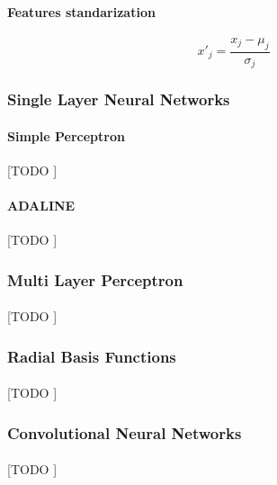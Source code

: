 \documentclass{article}
\begin{document}
			\paragraph{Features standarization}

			\begin{equation}
				x'_j = \frac{x_j - \mu_j}{\sigma_j}
			\end{equation}


			\subsubsection{Single Layer Neural Networks}
			\label{sec:single-layer-nn}


				\paragraph{Simple Perceptron}
				\label{sec:perceptron}
				[TODO ]

				\paragraph{ADALINE}
				\label{sec:adaline}
				[TODO ]

			\subsubsection{Multi Layer Perceptron}
			\label{sec:mlp}

				\paragraph{}
				[TODO ]

			\subsubsection{Radial Basis Functions}
			\label{sec:rbf}

				\paragraph{}
				[TODO ]

			\subsubsection{Convolutional Neural Networks}
			\label{sec:cnn}

				\paragraph{}
				[TODO ]
\end{document}
